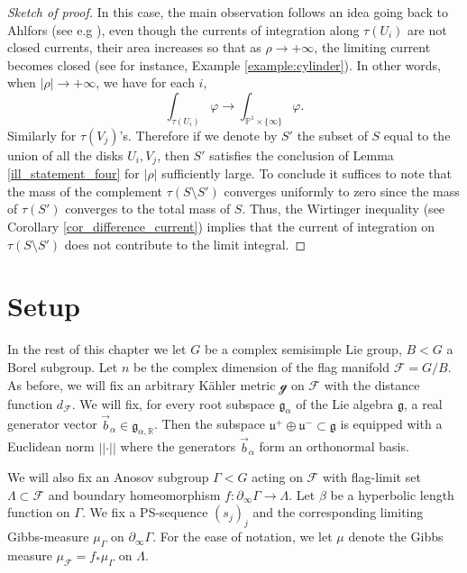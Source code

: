 \documentclass[12pt]{amsbook}%
\theoremstyle{definition}
\theoremstyle{remark}
\numberwithin{section}{chapter}
\numberwithin{subsection}{section}
\numberwithin{figure}{chapter}
\def\dF{d_{\mathcal{F}}}
\def\bR{{\mathbb{R}}}
\def\bP{{\mathbb{P}}}
\def\cF{{\mathscr{F}}}
\def\fu{{\mathfrak{u}}}
\def\fuwp{{\mathfrak{u}_w^+}}
\def\fuwm{{\mathfrak{u}_w^-}}
\def\Ga{\Gamma}
\def\La{\Lambda}
\def\geo{\partial_\infty}
\begin{document}
{{\begin{proof}[Sketch of proof]




In this case, the main observation follows an idea going back to Ahlfors (see e.g \cite[\S~2]{brunella}), even though the currents of integration along $\tau(U_i)$ are not closed currents, their area increases so that as $\rho \rightarrow +\infty$, the limiting current becomes closed (see for instance, Example \ref{example:cylinder}).  
In other words,  
 when $\lvert \rho \rvert\rightarrow +\infty$, we have for each $i$,
\[
\int_{\tau(U_i)}\varphi\rightarrow 
\int_{\bP^1\times \{\infty\}}\varphi.
\]
Similarly for $\tau(V_j)$'s. Therefore if we denote by $S'$ the subset of $S$ equal to the union of all the disks $U_i,V_j$, then $S'$ satisfies the conclusion of Lemma \ref{ill_statement_four} for $\lvert \rho \rvert$ sufficiently large. To conclude it suffices to note that the mass of the complement $\tau(S\setminus S')$ converges uniformly to zero since the mass of $\tau(S')$ converges to the total mass of $S$.  Thus, 
the Wirtinger inequality (see Corollary \ref{cor_difference_current}) implies that 
the current of integration on $\tau(S\setminus S')$ does not contribute to the limit integral. 
\end{proof}






\section{Setup}\label{sec:flag_setup}

In the rest of this chapter we let $G$ be a complex semisimple Lie group, $B< G$ a Borel subgroup. Let $n$ be the 
complex dimension of the flag manifold $\cF=G/B$. As before, we will fix an arbitrary K\"ahler metric $\mathcal{g}$ on $\cF$ with the distance function $\dF$. 
We will fix, for every root subspace $\mathfrak{g}_\alpha$ of the Lie algebra $\mathfrak{g}$, a real generator vector $\vec{b}_\alpha\in \mathfrak{g}_{\alpha,\bR}$. Then %
the subspace  $\fu^+\oplus \fu^-\subset \mathfrak{g}$ 
is equipped with a Euclidean norm $\vert\vert \cdot \vert\vert$ where the 
generators $\vec{b}_\alpha$ form an orthonormal basis. 

We will also fix an Anosov subgroup $\Gamma< G$ acting on $\cF$ with flag-limit set $\Lambda\subset \cF$ and boundary homeomorphism 
$f: \geo \Gamma \rightarrow \Lambda$. Let $\beta$ be a hyperbolic length function on $\Gamma$. We fix a PS-sequence $(s_j)_j$ 
and the corresponding limiting Gibbs-measure $\mu_{\Ga}$ on $\geo \Gamma$. 
For the ease of notation, we let $\mu$ denote the Gibbs measure $\mu_{\cF}=f_*\mu_{\Ga}$ on $\La$.

}}
\end{document}
